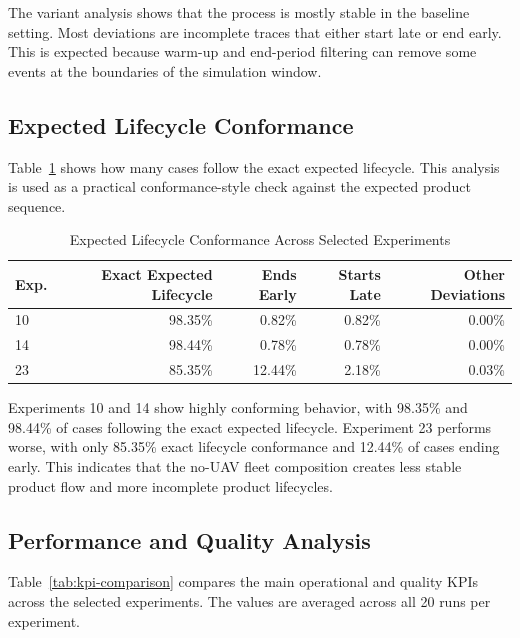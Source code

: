 \documentclass[conference]{IEEEtran}
\begin{document}
The variant analysis shows that the process is mostly stable in the baseline setting. Most deviations are incomplete traces that either start late or end early. This is expected because warm-up and end-period filtering can remove some events at the boundaries of the simulation window.

\subsection{Expected Lifecycle Conformance}

Table~\ref{tab:lifecycle-conformance} shows how many cases follow the exact expected lifecycle. This analysis is used as a practical conformance-style check against the expected product sequence.

\begin{table}[t]
\caption{Expected Lifecycle Conformance Across Selected Experiments}
\label{tab:lifecycle-conformance}
\centering
\begin{tabular}{|l|r|r|r|r|}
\hline
\textbf{Exp.} & \textbf{Exact Expected Lifecycle} & \textbf{Ends Early} & \textbf{Starts Late} & \textbf{Other Deviations} \\
\hline
10 & 98.35\% & 0.82\% & 0.82\% & 0.00\% \\
\hline
14 & 98.44\% & 0.78\% & 0.78\% & 0.00\% \\
\hline
23 & 85.35\% & 12.44\% & 2.18\% & 0.03\% \\
\hline
\end{tabular}
\end{table}

Experiments 10 and 14 show highly conforming behavior, with 98.35\% and 98.44\% of cases following the exact expected lifecycle. Experiment 23 performs worse, with only 85.35\% exact lifecycle conformance and 12.44\% of cases ending early. This indicates that the no-UAV fleet composition creates less stable product flow and more incomplete product lifecycles.

\subsection{Performance and Quality Analysis}

Table~\ref{tab:kpi-comparison} compares the main operational and quality KPIs across the selected experiments. The values are averaged across all 20 runs per experiment.
\end{document}
